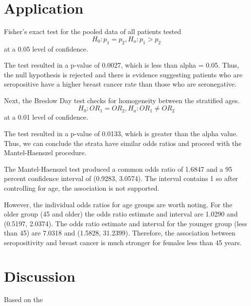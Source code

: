 \documentclass[12pt, titlepage]{article}
\begin{document}
\section{Application}
\label{sec:app}
Fisher's exact test for the pooled data of all patients tested 
\[
H_{0}:p_{1}=p_{2}, H_{a}:p_{1}>p_{2}
\]
at a 0.05 level of confidence.

The test resulted in a p-value of 0.0027, which is less than 
alpha = 0.05. Thus, the null hypothesis is rejected and there 
is evidence suggesting patients who are seropositive have a
higher breast cancer rate than those who are seronegative.

Next, the Breslow Day test checks for homogeneity between the 
stratified ages. 
\[
H_{0}:OR_{1}=OR_{2}, H_{a}:OR_{1}\neq{OR_{2}}
\]
at a 0.01 level of confidence. 

The test resulted in a p-value of 0.0133, which is greater than
the alpha value. Thus, we can conclude the strata have similar
odds ratios and proceed with the Mantel-Haenszel procedure. 

The Mantel-Haenszel test produced a common odds ratio of 1.6847 and 
a 95 percent confidence interval of (0.9283, 3.0574). The interval
contains 1 so after controlling for age, the association is not supported.

However, the individual odds ratios for age groups are worth noting. For 
the older group (45 and older) the odds ratio estimate and interval are 
1.0290 and (0.5197, 2.0374). The odds ratio estimate and interval for the 
younger group (less than 45) are 7.0318 and (1.5828, 31.2399). Therefore,
the association between seropositivity and breast cancer is much stronger
for females less than 45 years. 

\section{Discussion}
\label{sec:discuss}
Based on the 




\end{document}
